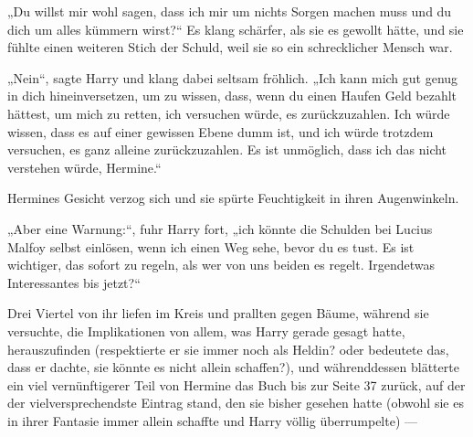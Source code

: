 „Du willst mir wohl sagen, dass ich mir um nichts Sorgen machen muss und du dich um alles kümmern wirst?“ Es klang schärfer, als sie es gewollt hätte, und sie fühlte einen weiteren Stich der Schuld, weil sie so ein schrecklicher Mensch war.

„Nein“, sagte Harry und klang dabei seltsam fröhlich.
„Ich kann mich gut genug in dich hineinversetzen, um zu wissen, dass, wenn du einen Haufen Geld bezahlt hättest, um mich zu retten, ich versuchen würde, es zurückzuzahlen. Ich würde wissen, dass es auf einer gewissen Ebene dumm ist, und ich würde trotzdem versuchen, es ganz alleine zurückzuzahlen. Es ist unmöglich, dass ich das nicht verstehen würde, Hermine.“

Hermines Gesicht verzog sich und sie spürte Feuchtigkeit in ihren Augenwinkeln.

„Aber eine Warnung:“, fuhr Harry fort, „ich könnte die Schulden bei Lucius Malfoy selbst einlösen, wenn ich einen Weg sehe, bevor du es tust. Es ist wichtiger, das sofort zu regeln, als wer von uns beiden es regelt. Irgendetwas Interessantes bis jetzt?“

Drei Viertel von ihr liefen im Kreis und prallten gegen Bäume, während sie versuchte, die Implikationen von allem, was Harry gerade gesagt hatte, herauszufinden (respektierte er sie immer noch als Heldin? oder bedeutete das, dass er dachte, sie könnte es nicht allein schaffen?), und währenddessen blätterte ein viel vernünftigerer Teil von Hermine das Buch bis zur Seite 37 zurück, auf der der vielversprechendste Eintrag stand, den sie bisher gesehen hatte (obwohl sie es in ihrer Fantasie immer allein schaffte und Harry völlig überrumpelte) —

